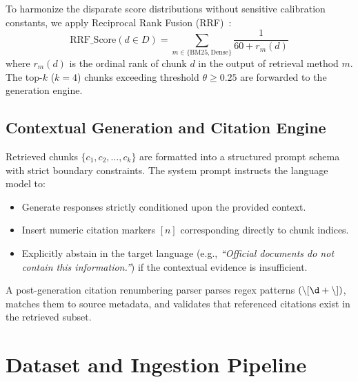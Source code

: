 \documentclass[conference]{IEEEtran}
\begin{document}
To harmonize the disparate score distributions without sensitive calibration constants, we apply Reciprocal Rank Fusion (RRF)~\cite{cormack2009rrf}:
\begin{equation}
\text{RRF\_Score}(d \in D) = \sum_{m \in \{\text{BM25}, \text{Dense}\}} \frac{1}{60 + r_m(d)}
\end{equation}
where $r_m(d)$ is the ordinal rank of chunk $d$ in the output of retrieval method $m$. The top-$k$ ($k=4$) chunks exceeding threshold $\theta \ge 0.25$ are forwarded to the generation engine.

\subsection{Contextual Generation and Citation Engine}
Retrieved chunks $\{c_1, c_2, \dots, c_k\}$ are formatted into a structured prompt schema with strict boundary constraints. The system prompt instructs the language model to:
\begin{itemize}
    \item Generate responses strictly conditioned upon the provided context.
    \item Insert numeric citation markers $[n]$ corresponding directly to chunk indices.
    \item Explicitly abstain in the target language (e.g., \textit{``Official documents do not contain this information.''}) if the contextual evidence is insufficient.
\end{itemize}

A post-generation citation renumbering parser parses regex patterns $(\backslash[\d+\backslash])$, matches them to source metadata, and validates that referenced citations exist in the retrieved subset.

\section{Dataset and Ingestion Pipeline}
\end{document}
